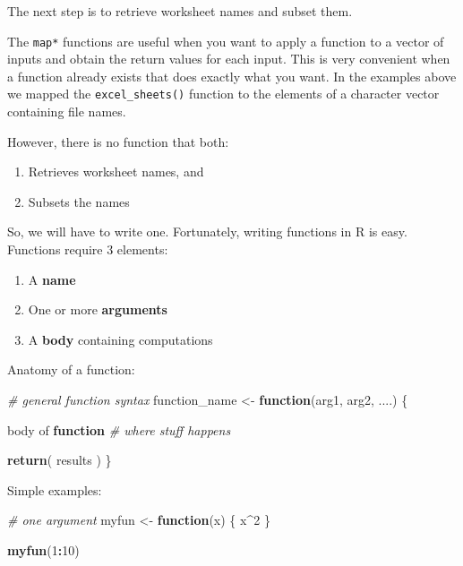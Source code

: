 \documentclass[
]{book}
\newenvironment{Shaded}{\begin{snugshade}}{\end{snugshade}}
\newcommand{\CommentTok}[1]{\textcolor[rgb]{0.56,0.35,0.01}{\textit{#1}}}
\newcommand{\ControlFlowTok}[1]{\textcolor[rgb]{0.13,0.29,0.53}{\textbf{#1}}}
\newcommand{\DecValTok}[1]{\textcolor[rgb]{0.00,0.00,0.81}{#1}}
\newcommand{\KeywordTok}[1]{\textcolor[rgb]{0.13,0.29,0.53}{\textbf{#1}}}
\newcommand{\NormalTok}[1]{#1}
\newcommand{\OperatorTok}[1]{\textcolor[rgb]{0.81,0.36,0.00}{\textbf{#1}}}
\newcommand{\StringTok}[1]{\textcolor[rgb]{0.31,0.60,0.02}{#1}}
\providecommand{\tightlist}{%
  \setlength{\itemsep}{0pt}\setlength{\parskip}{0pt}}
\begin{document}
The next step is to retrieve worksheet names and subset them.

The \texttt{map*} functions are useful when you want to apply a function to a vector of inputs and obtain the return values for each input. This is very convenient when a function already exists that does exactly what you want. In the examples above we mapped the \texttt{excel\_sheets()} function to the elements of a character vector containing file names.

However, there is no function that both:

\begin{enumerate}
\def\labelenumi{\arabic{enumi}.}
\tightlist
\item
  Retrieves worksheet names, and
\item
  Subsets the names
\end{enumerate}

So, we will have to write one. Fortunately, writing functions in R is easy. Functions require 3 elements:

\begin{enumerate}
\def\labelenumi{\arabic{enumi}.}
\tightlist
\item
  A \textbf{name}
\item
  One or more \textbf{arguments}
\item
  A \textbf{body} containing computations
\end{enumerate}

Anatomy of a function:

\begin{Shaded}
\begin{Highlighting}[]
\CommentTok{\# general function syntax}
\NormalTok{function\_name \textless{}{-}}\StringTok{ }\ControlFlowTok{function}\NormalTok{(arg1, arg2, ....) \{}
  
\NormalTok{    body of }\ControlFlowTok{function} \CommentTok{\# where stuff happens }

    \KeywordTok{return}\NormalTok{( results ) }
\NormalTok{\}}
\end{Highlighting}
\end{Shaded}

Simple examples:

\begin{Shaded}
\begin{Highlighting}[]
\CommentTok{\# one argument}
\NormalTok{myfun \textless{}{-}}\StringTok{ }\ControlFlowTok{function}\NormalTok{(x) \{}
\NormalTok{  x}\OperatorTok{\^{}}\DecValTok{2}
\NormalTok{\}}

\KeywordTok{myfun}\NormalTok{(}\DecValTok{1}\OperatorTok{:}\DecValTok{10}\NormalTok{)}
\end{Highlighting}
\end{Shaded}
\end{document}
